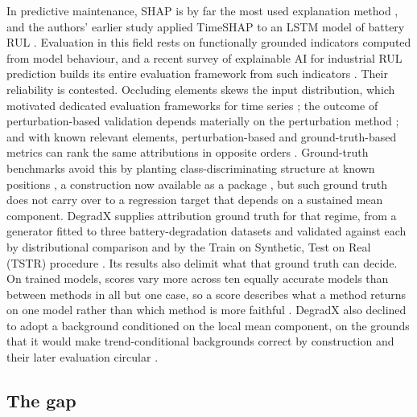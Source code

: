 \documentclass{article}
\begin{document}
In predictive maintenance, SHAP is by far the most used explanation method \citep{cummins2024explainable}, and the authors' earlier study applied TimeSHAP to an LSTM model of battery RUL \citep{mishchuk2026explaining}. Evaluation in this field rests on functionally grounded indicators computed from model behaviour, and a recent survey of explainable AI for industrial RUL prediction builds its entire evaluation framework from such indicators \citep{qu2026explainable}. Their reliability is contested. Occluding elements skews the input distribution, which motivated dedicated evaluation frameworks for time series \citep{turbe2023evaluation}; the outcome of perturbation-based validation depends materially on the perturbation method \citep{simic2025comprehensive}; and with known relevant elements, perturbation-based and ground-truth-based metrics can rank the same attributions in opposite orders \citep{baer2026class}. Ground-truth benchmarks avoid this by planting class-discriminating structure at known positions \citep{ismail2020benchmarking, tonekaboni2020went, queen2023encoding}, a construction now available as a package \citep{baer2026xaitimesynth}, but such ground truth does not carry over to a regression target that depends on a sustained mean component. DegradX supplies attribution ground truth for that regime, from a generator fitted to three battery-degradation datasets and validated against each by distributional comparison and by the Train on Synthetic, Test on Real (TSTR) procedure \citep{degradx2026, esteban2017real}. Its results also delimit what that ground truth can decide. On trained models, scores vary more across ten equally accurate models than between methods in all but one case, so a score describes what a method returns on one model rather than which method is more faithful \citep{degradx2026}. DegradX also declined to adopt a background conditioned on the local mean component, on the grounds that it would make trend-conditional backgrounds correct by construction and their later evaluation circular \citep{degradxrepo}.

\subsection{The gap}\label{sec:related:gap}
\end{document}
